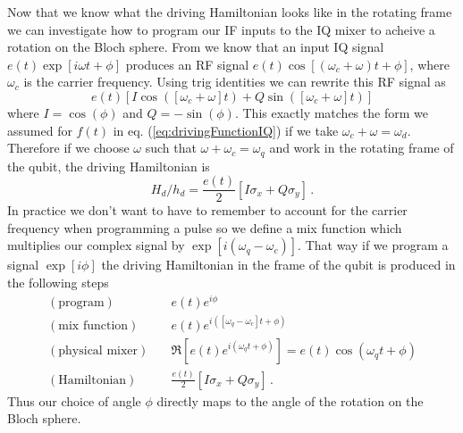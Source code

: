 Now that we know what the driving Hamiltonian looks like in the rotating frame we can investigate how to program our IF inputs to the IQ mixer to acheive a rotation on the Bloch sphere.
From  we know that an input IQ signal $e(t)\exp\left[i\omega t + \phi\right]$ produces an RF signal $ e(t)\cos\left[(\omega_c+\omega)t + \phi \right]$, where $\omega_c$ is the carrier frequency.
Using trig identities we can rewrite this RF signal as
\begin{equation}
  e(t)
  \left[
      I \cos(\left[\omega_c + \omega \right] t)
    + Q \sin(\left[\omega_c + \omega \right] t)
  \right]
  \nonumber
\end{equation}
where $I=\cos(\phi)$ and $Q=-\sin(\phi)$.
This exactly matches the form we assumed for $f(t)$ in eq. (\ref{eq:drivingFunctionIQ}) if we take $\omega_c + \omega = \omega_d$.
Therefore if we choose $\omega$ such that $\omega + \omega_c = \omega_q$ and work in the rotating frame of the qubit, the driving Hamiltonian is
\begin{equation}
  H_d/h_d = \frac{e(t)}{2}\left[I\sigma_x + Q\sigma_y\right] \, .
\end{equation}
In practice we don't want to have to remember to account for the carrier frequency when programming a pulse so we define a mix function which multiplies our complex signal by $\exp\left[i(\omega_{q} - \omega_c)\right]$.
That way if we program a signal $\exp\left[i\phi\right]$ the driving Hamiltonian in the frame of the qubit is produced in the following steps
\begin{align*}
  (\text{program}) & \quad e(t) e^{i\phi} \\
  (\text{mix function}) & \quad e(t) e^{i([\omega_q-\omega_c]t + \phi)} \\
  (\text{physical mixer}) & \quad \Re \left[ e(t) e^{i(\omega_q t + \phi)} \right] = e(t) \cos\left(\omega_q t + \phi \right) \\
  (\text{Hamiltonian}) & \quad \frac{e(t)}{2}\left[ I \sigma_x + Q \sigma_y \right] \, .
\end{align*}
Thus our choice of angle $\phi$ directly maps to the angle of the rotation on the Bloch sphere.


